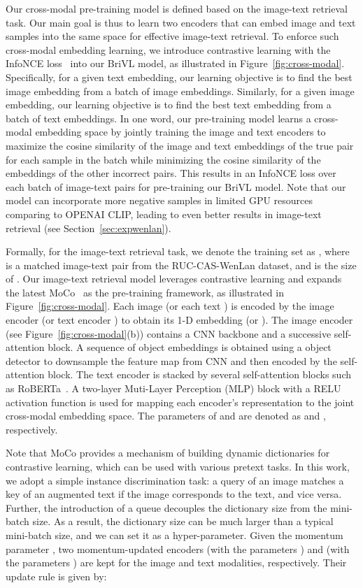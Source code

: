 \documentclass[10pt,twocolumn,letterpaper]{article}
\begin{document}
Our cross-modal pre-training model is defined based on the image-text retrieval task. Our main goal is thus to learn two encoders that can embed image and text samples into the same space for effective image-text retrieval.
To enforce such cross-modal embedding learning, we introduce contrastive learning with the InfoNCE loss~\cite{oord2018representation} into our BriVL model, as illustrated in Figure~\ref{fig:cross-modal}. Specifically, for a given text embedding, our learning objective is to find the best image embedding from a batch of image embeddings. Similarly, for a given image embedding, our learning objective is to find the best text embedding from a batch of text embeddings.
In one word, our pre-training model learns a cross-modal embedding space by jointly training the image and text encoders to maximize the cosine similarity of the image and text embeddings of the true pair for each sample in the batch while minimizing the cosine similarity of the embeddings of the other incorrect pairs.
This results in an InfoNCE loss over each batch of image-text pairs for pre-training our BriVL model.
Note that our model can incorporate more negative samples in limited GPU resources comparing to OPENAI CLIP, leading to even better results in image-text retrieval (see Section~\ref{sec:expwenlan}).

Formally, for the image-text retrieval task, we denote the training set as , where  is a matched image-text pair from the RUC-CAS-WenLan dataset, and  is the size of .
Our image-text retrieval model leverages contrastive learning and expands the latest MoCo~\cite{he2020momentum} as the pre-training framework, as illustrated in Figure~\ref{fig:cross-modal}. Each image  (or each text ) is encoded by the image encoder  (or text encoder ) to obtain its 1-D embedding   (or ). The image encoder (see Figure~\ref{fig:cross-modal}(b)) contains a CNN backbone and a successive self-attention block. A sequence of object embeddings is obtained using a object detector to downsample the feature map from CNN and then encoded by the self-attention block. The text encoder is stacked by several self-attention blocks such as RoBERTa~\cite{liu2019roberta}.
A two-layer Muti-Layer Perception (MLP) block with a RELU activation function is used for mapping each encoder’s representation to the joint cross-modal embedding space.
The parameters of  and  are denoted as  and , respectively.

Note that MoCo provides a mechanism of building dynamic dictionaries for contrastive learning, which can be used with various pretext tasks. In this work, we adopt a simple instance discrimination task: a query of an image matches a key of an augmented text if the image corresponds to the text, and vice versa. Further, the introduction of a queue decouples the dictionary size from the mini-batch size. As a result, the dictionary size can be much larger than a typical mini-batch size, and we can set it as a hyper-parameter. Given the momentum parameter , two momentum-updated encoders  (with the parameters ) and  (with the parameters ) are kept for the image and text modalities, respectively. Their update rule is given by:
\end{document}

